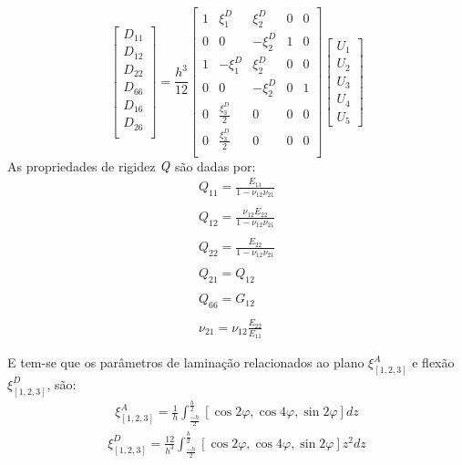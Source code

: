 \begin{equation} \label{D_matrix}
\begin{bmatrix}
    D_{11} \\D_{12} \\D_{22} \\D_{66} \\D_{16} \\D_{26} \\
\end{bmatrix}
= \frac{h^3}{12}
\begin{bmatrix}
		1 & \xi^D_1 & \xi^D_2 & 0 & 0 \\
		0 & 0 & -\xi^D_2 & 1 & 0 \\
    1 & -\xi^D_1 & \xi^D_2 & 0 & 0 \\
		0 & 0 & -\xi^D_2 & 0 & 1 \\
		0 & \frac{\xi^D_3}{2} & 0 & 0 & 0 \\
		0 & \frac{\xi^D_3}{2} & 0 & 0 & 0 \\
\end{bmatrix}
\begin{bmatrix}
    U_1\\  U_2 \\ U_3 \\ U_4 \\ U_5
\end{bmatrix}
\end{equation}
As propriedades de rigidez $\emph{Q}$ são dadas por:
\begin{equation} \label{Q_properties}
\begin{gathered}
Q_{11}=\frac{E_{11}}{1-\nu_{12}\nu_{21}}\\~\\
Q_{12}=\frac{\nu_{12}E_{22}}{1-\nu_{12}\nu_{21}}\\~\\
Q_{22}=\frac{E_{22}}{1-\nu_{12}\nu_{21}}\\~\\
Q_{21}=Q_{12}\\~\\
Q_{66}=G_{12}\\~\\
\nu_{21}=\nu_{12}\frac{E_{22}}{E_{11}}
\end{gathered}
\end{equation}

E tem-se que os parâmetros de laminação relacionados ao plano $\xi^A_{[1, 2, 3]}$ e flexão $\xi^D_{[1, 2, 3]}$, são:
\begin{equation}\label{qsiA}
\begin{gathered}
	\xi^A_{[1, 2, 3]} = \frac{1}{h}\int^{\frac{h}{2}}_{\frac{-h}{2}}[\cos2\varphi, \cos4\varphi, \sin2\varphi]dz
\end{gathered}
\end{equation}
\begin{equation}\label{qsiD}
\begin{gathered}
	\xi^D_{[1, 2, 3]} = \frac{12}{h^3}\int^{\frac{h}{2}}_{\frac{-h}{2}}[\cos2\varphi, \cos4\varphi, \sin2\varphi]z^2dz
\end{gathered}
\end{equation}

